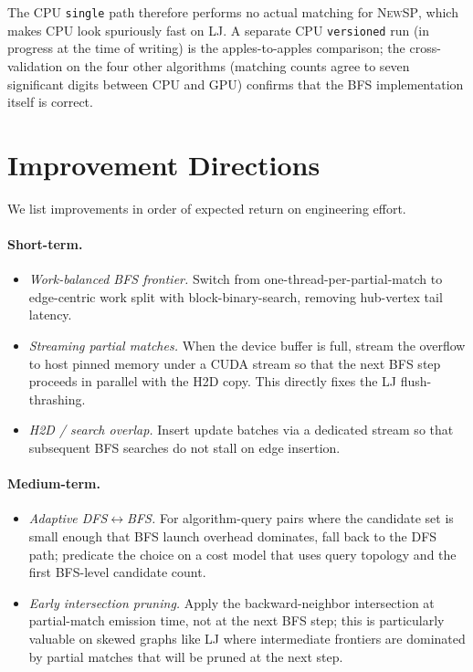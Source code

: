 \documentclass[sigconf,nonacm]{acmart}
\theoremstyle{definition}
\begin{document}
The CPU \texttt{single} path therefore performs no actual matching for \textsc{NewSP}, which makes CPU look spuriously fast on LJ. A separate CPU \texttt{versioned} run (in progress at the time of writing) is the apples-to-apples comparison; the cross-validation on the four other algorithms (matching counts agree to seven significant digits between CPU and GPU) confirms that the BFS implementation itself is correct.

\section{Improvement Directions}
\label{sec:improvements-short}
We list improvements in order of expected return on engineering effort.

\paragraph{Short-term.}
\begin{itemize}
  \item \emph{Work-balanced BFS frontier.} Switch from one-thread-per-partial-match to edge-centric work split with block-binary-search, removing hub-vertex tail latency.
  \item \emph{Streaming partial matches.} When the device buffer is full, stream the overflow to host pinned memory under a CUDA stream so that the next BFS step proceeds in parallel with the H2D copy. This directly fixes the LJ flush-thrashing.
  \item \emph{H2D / search overlap.} Insert update batches via a dedicated stream so that subsequent BFS searches do not stall on edge insertion.
\end{itemize}

\paragraph{Medium-term.}
\begin{itemize}
  \item \emph{Adaptive DFS$\leftrightarrow$BFS.} For algorithm-query pairs where the candidate set is small enough that BFS launch overhead dominates, fall back to the DFS path; predicate the choice on a cost model that uses query topology and the first BFS-level candidate count.
  \item \emph{Early intersection pruning.} Apply the backward-neighbor intersection at partial-match emission time, not at the next BFS step; this is particularly valuable on skewed graphs like LJ where intermediate frontiers are dominated by partial matches that will be pruned at the next step.
\end{itemize}
\end{document}
